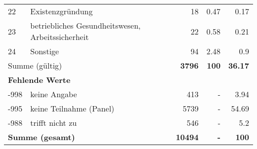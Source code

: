 \begin{longtable}{lXrrr}
        22 & \multicolumn{1}{X}{Existenzgründung} & %
          \num{18} &
          \num[round-mode=places,round-precision=2]{0,47} &
          \num[round-mode=places,round-precision=2]{0,17} \\

        23 & \multicolumn{1}{X}{betriebliches Gesundheitswesen, Arbeitssicherheit} & %
          \num{22} &
          \num[round-mode=places,round-precision=2]{0,58} &
          \num[round-mode=places,round-precision=2]{0,21} \\

        24 & \multicolumn{1}{X}{Sonstige} & %
          \num{94} &
          \num[round-mode=places,round-precision=2]{2,48} &
          \num[round-mode=places,round-precision=2]{0,9} \\

     \midrule
     \multicolumn{2}{l}{Summe (gültig)} &
       \textbf{\num{3796}} &
     \textbf{100} &
       \textbf{\num[round-mode=places,round-precision=2]{36,17}} \\
     \multicolumn{5}{l}{\textbf{Fehlende Werte}}\\
       -998 &
       keine Angabe &
         \num{413} &
        - &
         \num[round-mode=places,round-precision=2]{3,94} \\
       -995 &
       keine Teilnahme (Panel) &
         \num{5739} &
        - &
         \num[round-mode=places,round-precision=2]{54,69} \\
       -988 &
       trifft nicht zu &
         \num{546} &
        - &
         \num[round-mode=places,round-precision=2]{5,2} \\
     \midrule
     \multicolumn{2}{l}{\textbf{Summe (gesamt)}} &
          \textbf{\num{10494}} &
        \textbf{-} &
        \textbf{100} \\
     \bottomrule
     \end{longtable}
     
